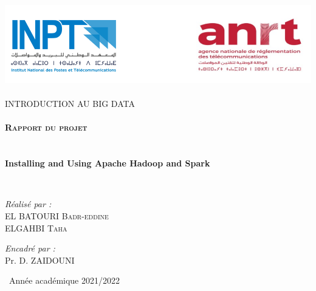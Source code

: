 \begin{titlepage}
\begin{center}

\includegraphics[width=1\textwidth]{./INPT+ANRT}~\\[1.5cm]

\textsc{\Large INTRODUCTION AU BIG DATA }\\[2.5cm]

\textsc{\Large }\\[0.4cm]

\textsc{\LARGE \textbf{Rapport du projet}}\\[0.3cm]



\HRule \\[0.5cm]


\vspace{.5cm}
{\huge \bfseries \\ Installing and Using Apache Hadoop and Spark \\[0.7cm] }

\HRule \\[1.5cm]
\vspace{1.2cm}

\begin{minipage}{0.4\textwidth}
\begin{flushleft} \large
\emph{Réalisé par :}\\[0.5 cm]
EL BATOURI  \textsc{ Badr-eddine}\\
ELGAHBI  \textsc{ Taha}\\

\end{flushleft}
\end{minipage}
\begin{minipage}{0.4\textwidth}
\begin{flushright} \large
\emph{Encadré par :} \\[0.5 cm]
Pr. D. \textsc{ZAIDOUNI}\\
 
\end{flushright}
\end{minipage}



\vfill


{\large \ Année académique 2021/2022}

\end{center}
\end{titlepage}